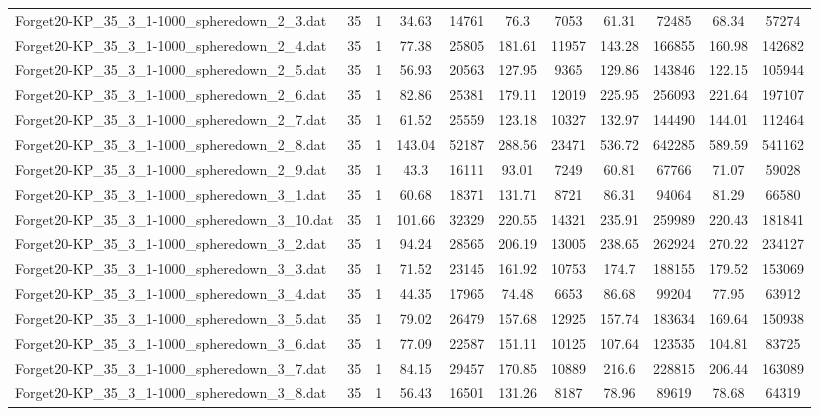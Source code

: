 \begin{table}[!ht]
\begin{tabular}{lcccccccccc}
Forget20-KP\_35\_3\_1-1000\_spheredown\_2\_3.dat & 35 & 1 & 34.63 & 14761 & 76.3 & 7053 & 61.31 & 72485 & 68.34 & 57274 \\
Forget20-KP\_35\_3\_1-1000\_spheredown\_2\_4.dat & 35 & 1 & 77.38 & 25805 & 181.61 & 11957 & 143.28 & 166855 & 160.98 & 142682 \\
Forget20-KP\_35\_3\_1-1000\_spheredown\_2\_5.dat & 35 & 1 & 56.93 & 20563 & 127.95 & 9365 & 129.86 & 143846 & 122.15 & 105944 \\
Forget20-KP\_35\_3\_1-1000\_spheredown\_2\_6.dat & 35 & 1 & 82.86 & 25381 & 179.11 & 12019 & 225.95 & 256093 & 221.64 & 197107 \\
Forget20-KP\_35\_3\_1-1000\_spheredown\_2\_7.dat & 35 & 1 & 61.52 & 25559 & 123.18 & 10327 & 132.97 & 144490 & 144.01 & 112464 \\
Forget20-KP\_35\_3\_1-1000\_spheredown\_2\_8.dat & 35 & 1 & 143.04 & 52187 & 288.56 & 23471 & 536.72 & 642285 & 589.59 & 541162 \\
Forget20-KP\_35\_3\_1-1000\_spheredown\_2\_9.dat & 35 & 1 & 43.3 & 16111 & 93.01 & 7249 & 60.81 & 67766 & 71.07 & 59028 \\
Forget20-KP\_35\_3\_1-1000\_spheredown\_3\_1.dat & 35 & 1 & 60.68 & 18371 & 131.71 & 8721 & 86.31 & 94064 & 81.29 & 66580 \\
Forget20-KP\_35\_3\_1-1000\_spheredown\_3\_10.dat & 35 & 1 & 101.66 & 32329 & 220.55 & 14321 & 235.91 & 259989 & 220.43 & 181841 \\
Forget20-KP\_35\_3\_1-1000\_spheredown\_3\_2.dat & 35 & 1 & 94.24 & 28565 & 206.19 & 13005 & 238.65 & 262924 & 270.22 & 234127 \\
Forget20-KP\_35\_3\_1-1000\_spheredown\_3\_3.dat & 35 & 1 & 71.52 & 23145 & 161.92 & 10753 & 174.7 & 188155 & 179.52 & 153069 \\
Forget20-KP\_35\_3\_1-1000\_spheredown\_3\_4.dat & 35 & 1 & 44.35 & 17965 & 74.48 & 6653 & 86.68 & 99204 & 77.95 & 63912 \\
Forget20-KP\_35\_3\_1-1000\_spheredown\_3\_5.dat & 35 & 1 & 79.02 & 26479 & 157.68 & 12925 & 157.74 & 183634 & 169.64 & 150938 \\
Forget20-KP\_35\_3\_1-1000\_spheredown\_3\_6.dat & 35 & 1 & 77.09 & 22587 & 151.11 & 10125 & 107.64 & 123535 & 104.81 & 83725 \\
Forget20-KP\_35\_3\_1-1000\_spheredown\_3\_7.dat & 35 & 1 & 84.15 & 29457 & 170.85 & 10889 & 216.6 & 228815 & 206.44 & 163089 \\
Forget20-KP\_35\_3\_1-1000\_spheredown\_3\_8.dat & 35 & 1 & 56.43 & 16501 & 131.26 & 8187 & 78.96 & 89619 & 78.68 & 64319 \\

\end{tabular}
\end{table}
